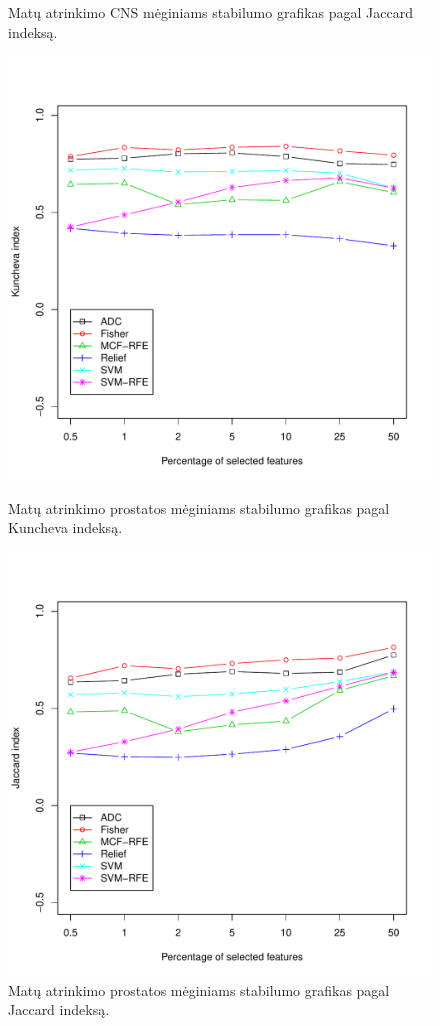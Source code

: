 \begin{figure}[H]
\begin{minipage}[b]{0.5\linewidth}
\caption{Matų atrinkimo CNS mėginiams stabilumo grafikas pagal Jaccard indeksą.}
\label{fig:robj_cns}
\end{minipage}
\hspace{0.2cm}
\begin{minipage}[b]{0.5\linewidth}
\centering
\includegraphics[width=.85\textwidth]{../bachelor/images/prostate_robustness_kuncheva.pdf}
\caption{Matų atrinkimo prostatos mėginiams stabilumo grafikas pagal Kuncheva indeksą.}
\label{fig:robk_prostate}
\end{minipage}
\hspace{0.2cm}
\begin{minipage}[b]{0.5\linewidth}
\centering
\includegraphics[width=.85\textwidth]{../bachelor/images/prostate_robustness_jaccard.pdf}
\caption{Matų atrinkimo prostatos mėginiams stabilumo grafikas pagal Jaccard indeksą.}
\label{fig:robj_prostate}
\end{minipage}
\end{figure}
